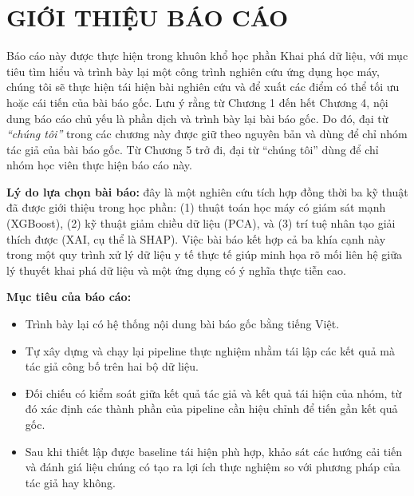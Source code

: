 \chapter*{GIỚI THIỆU BÁO CÁO}
Báo cáo này được thực hiện trong khuôn khổ học phần Khai phá dữ liệu, với
mục tiêu tìm hiểu và trình bày lại một công trình nghiên cứu ứng dụng học máy, chúng tôi sẽ thực hiện tái hiện bài nghiên cứu và để xuất các điểm có thể tối ưu hoặc cái tiến của bài báo gốc. Lưu ý rằng từ Chương 1 đến hết Chương 4, nội dung báo cáo chủ yếu là phần dịch và
trình bày lại bài báo gốc. Do đó, đại từ \textit{``chúng tôi''} trong
các chương này được giữ theo nguyên bản và dùng để chỉ nhóm tác giả của bài báo gốc. Từ Chương 5 trở đi, đại từ ``chúng tôi'' dùng để chỉ nhóm học viên thực hiện báo cáo này.

\medskip

\noindent
\textbf{Lý do lựa chọn bài báo:} đây là một nghiên cứu tích hợp đồng thời ba
kỹ thuật đã được giới thiệu trong học phần: (1) thuật toán học máy có giám sát mạnh
(XGBoost), (2) kỹ thuật giảm chiều dữ liệu (PCA), và (3) trí tuệ nhân tạo giải
thích được (XAI, cụ thể là SHAP). Việc bài báo kết hợp cả ba khía cạnh này
trong một quy trình xử lý dữ liệu y tế thực tế giúp minh họa rõ mối liên hệ
giữa lý thuyết khai phá dữ liệu và một ứng dụng có ý nghĩa thực tiễn cao.

\medskip

\noindent
\textbf{Mục tiêu của báo cáo:}

\begin{itemize}
  \item Trình bày lại có hệ thống nội dung bài báo gốc bằng tiếng Việt.
  \item Tự xây dựng và chạy lại pipeline thực nghiệm nhằm tái lập các kết quả
  mà tác giả công bố trên hai bộ dữ liệu.
  \item Đối chiếu có kiểm soát giữa kết quả tác giả và kết quả tái hiện của nhóm,
  từ đó xác định các thành phần của pipeline cần hiệu chỉnh để tiến gần kết quả gốc.
  \item Sau khi thiết lập được baseline tái hiện phù hợp, khảo sát các hướng cải tiến
  và đánh giá liệu chúng có tạo ra lợi ích thực nghiệm so với phương pháp của tác giả hay không.
\end{itemize}

